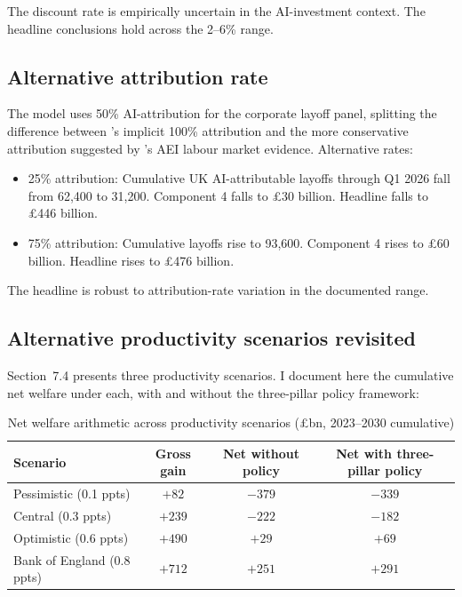 \documentclass[11pt,letterpaper]{article}
\theoremstyle{remark}
\begin{document}
The discount rate is empirically uncertain in the AI-investment context. The headline conclusions hold across the 2--6\% range.

\subsection{Alternative attribution rate}

The model uses 50\% AI-attribution for the corporate layoff panel, splitting the difference between \citet{morgan_stanley_2026}'s implicit 100\% attribution and the more conservative attribution suggested by \citet{british_progress_2026}'s AEI labour market evidence. Alternative rates:

\begin{itemize}
\item 25\% attribution: Cumulative UK AI-attributable layoffs through Q1 2026 fall from 62,400 to 31,200. Component 4 falls to \pounds30 billion. Headline falls to \pounds446 billion.
\item 75\% attribution: Cumulative layoffs rise to 93,600. Component 4 rises to \pounds60 billion. Headline rises to \pounds476 billion.
\end{itemize}

The headline is robust to attribution-rate variation in the documented range.

\subsection{Alternative productivity scenarios revisited}

Section~7.4 presents three productivity scenarios. I document here the cumulative net welfare under each, with and without the three-pillar policy framework:

\begin{table}[ht]
\centering
\caption{Net welfare arithmetic across productivity scenarios (\pounds bn, 2023--2030 cumulative)}
\begin{tabular}{lccc}
\toprule
Scenario & Gross gain & Net without policy & Net with three-pillar policy \\
\midrule
Pessimistic (0.1 ppts) & $+82$ & $-379$ & $-339$ \\
Central (0.3 ppts) & $+239$ & $-222$ & $-182$ \\
Optimistic (0.6 ppts) & $+490$ & $+29$ & $+69$ \\
Bank of England (0.8 ppts) & $+712$ & $+251$ & $+291$ \\
\bottomrule
\end{tabular}
\end{table}
\end{document}
